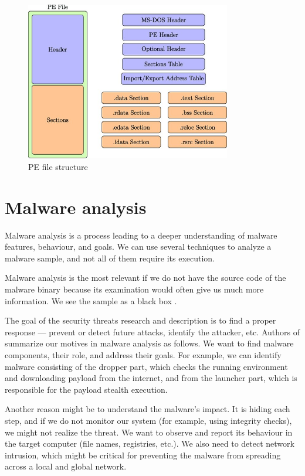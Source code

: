 \begin{figure}[h]
  \centering
  \includegraphics[width=0.8\textwidth]{figures/pe.jpg}
  \caption{PE file structure \cite{Gibert2020}}
  \label{fig:pe}
\end{figure}

\section{Malware analysis}
Malware analysis is a process leading to a deeper understanding of malware features, behaviour, and goals. We can use several techniques to analyze a malware sample, and not all of them require its execution.

Malware analysis is the most relevant if we do not have the source code of the malware binary because its examination would often give us much more information. We see the sample as a black box \cite{Sikorski2012}.

The goal of the security threats research and description is to find a proper response --- prevent or detect future attacks, identify the attacker, etc. Authors of \cite{KA2018} summarize our motives in malware analysis as follows. We want to find malware components, their role, and address their goals. For example, we can identify malware consisting of the dropper part, which checks the running environment and downloading payload from the internet, and from the launcher part, which is responsible for the payload stealth execution. 

Another reason might be to understand the malware's impact. It is hiding each step, and if we do not monitor our system (for example, using integrity checks), we might not realize the threat. We want to observe and report its behaviour in the target computer (file names, registries, etc.). We also need to detect network intrusion, which might be critical for preventing the malware from spreading across a local and global network. 

